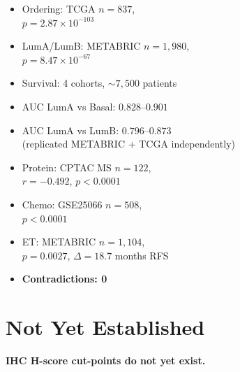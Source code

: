 \documentclass[9pt, a4paper]{article}
\begin{document}
\begin{multicols}{3}
\begin{mdframed}[backgroundcolor=statsbox,
                 linecolor=purple!40!black,
                 linewidth=0.6pt,
                 innertopmargin=2pt,
                 innerbottommargin=2pt,
                 innerleftmargin=4pt,
                 innerrightmargin=4pt,
                 skipabove=0pt,
                 skipbelow=2pt]
{\small
\begin{itemize}[noitemsep,
                leftmargin=*,
                topsep=0pt,
                itemsep=1pt]
    \item Ordering: TCGA $n{=}837$,\\
    $p{=}2.87{\times}10^{-103}$
    \item LumA/LumB: METABRIC $n{=}1{,}980$,\\
    $p{=}8.47{\times}10^{-67}$
    \item Survival: 4 cohorts,
    ${\sim}7{,}500$ patients
    \item AUC LumA vs Basal:
    $0.828$--$0.901$
    \item AUC LumA vs LumB:
    $0.796$--$0.873$\\
    {\scriptsize(replicated METABRIC + TCGA
    independently)}
    \item Protein: CPTAC MS $n{=}122$,\\
    $r{=}{-}0.492$, $p{<}0.0001$
    \item Chemo: GSE25066 $n{=}508$,\\
    $p{<}0.0001$
    \item ET: METABRIC $n{=}1{,}104$,\\
    $p{=}0.0027$,
    $\Delta{=}18.7$ months RFS
    \item \textbf{Contradictions: 0}
\end{itemize}}
\end{mdframed}

\section{Not Yet Established}

\begin{mdframed}[backgroundcolor=warningbox,
                 linecolor=orange!60!black,
                 linewidth=0.6pt,
                 innertopmargin=2pt,
                 innerbottommargin=2pt,
                 innerleftmargin=4pt,
                 innerrightmargin=4pt,
                 skipabove=0pt,
                 skipbelow=0pt]
{\small\textbf{IHC H-score cut-points
do not yet exist.}

}
\end{mdframed}
\end{multicols}
\end{document}
